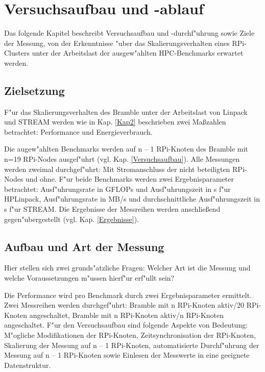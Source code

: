 \chapter{Versuchsaufbau und -ablauf}\label{Kap3}

Das folgende Kapitel beschreibt Versuchsaufbau und -durchf"uhrung sowie Ziele der Messung, von der Erkenntnisse "uber das Skalierungsverhalten eines RPi-Clusters unter der Arbeitslast der ausgew"ahlten HPC-Benchmarks erwartet werden. 

\section{Zielsetzung}\label{Ziel}

F"ur das Skalierungsverhalten des Bramble unter der Arbeitslast von Linpack und STREAM werden wie in Kap. \ref{Kap2} beschrieben zwei Ma\ss zahlen betrachtet: Performance und Energieverbrauch.

Die augew"ahlten Benchmarks werden auf n -- 1 RPi-Knoten des Bramble mit n=19 RPi-Nodes ausgef"uhrt (vgl. Kap. \ref{Versuchsaufbau}). Alle Messungen werden zweimal durchgef"uhrt: Mit Stromanschluss der nicht beteiligten RPi-Nodes und ohne. F"ur beide Benchmarks werden zwei Ergebnisparameter betrachtet: Ausf"uhrungsrate in GFLOPs und Ausf"uhrungszeit in s f"ur HPLinpack, Ausf"uhrungsrate in MB/s und durchschnittliche Ausf"uhrungszeit in s f"ur STREAM. Die Ergebnisse der Messreihen werden anschlie\ss end gegen"ubergestellt (vgl. Kap. \ref{Ergebnisse}). 

\section{Aufbau und Art der Messung}\label{Aufbau}

Hier stellen sich zwei grunds"atzliche Fragen: Welcher Art ist die Messung und welche Voraussetzungen m"ussen hierf"ur erf"ullt sein? 

Die Performance wird pro Benchmark durch zwei Ergebnisparameter ermittelt. Zwei Messreihen werden durchgef"uhrt: Bramble mit n RPi-Knoten aktiv/20 RPi-Knoten angeschaltet, Bramble mit n RPi-Knoten aktiv/n RPi-Knoten angeschaltet. 
F"ur den Versuchsaufbau sind folgende Aspekte von Bedeutung: M"ogliche Modifikationen der RPi-Knoten, Zeitsynchronisation der RPi-Knoten, Skalierung der Messung auf n -- 1 RPi-Knoten, automatisierte Durchf"uhrung der Messung auf n -- 1 RPi-Knoten sowie Einlesen der Messwerte in eine geeignete Datenstruktur. 

